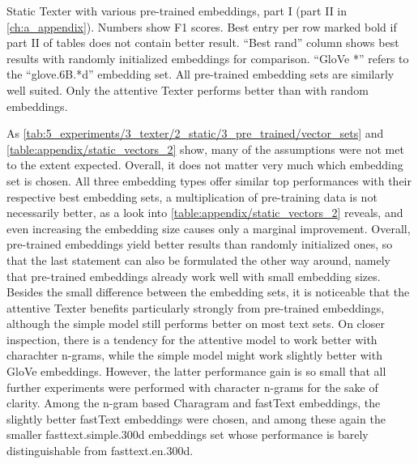 \begin{table}[t]
    \makebox[\textwidth][c]{
        
    }
    \caption{Static Texter with various pre-trained embeddings, part I (part II in \autoref{ch:a_appendix}). Numbers show F1 scores. Best entry per row marked bold if part II of tables does not contain better result. ``Best rand'' column shows best results with randomly initialized embeddings for comparison. ``GloVe *'' refers to the ``glove.6B.*d'' embedding set. All pre-trained embedding sets are similarly well suited. Only the attentive Texter performs better than with random embeddings.}
    \label{tab:5_experiments/3_texter/2_static/3_pre_trained/grid_search}
\end{table}

As \autoref{tab:5_experiments/3_texter/2_static/3_pre_trained/vector_sets} and \autoref{table:appendix/static_vectors_2} show, many of the assumptions were not met to the extent expected. Overall, it does not matter very much which embedding set is chosen. All three embedding types offer similar top performances with their respective best embedding sets, a multiplication of pre-training data is not necessarily better, as a look into \autoref{table:appendix/static_vectors_2} reveals, and even increasing the embedding size causes only a marginal improvement. Overall, pre-trained embeddings yield better results than randomly initialized ones, so that the last statement can also be formulated the other way around, namely that pre-trained embeddings already work well with small embedding sizes. Besides the small difference between the embedding sets, it is noticeable that the attentive Texter benefits particularly strongly from pre-trained embeddings, although the simple model still performs better on most text sets. On closer inspection, there is a tendency for the attentive model to work better with charachter n-grams, while the simple model might work slightly better with GloVe embeddings. However, the latter performance gain is so small that all further experiments were performed with character n-grams for the sake of clarity. Among the n-gram based Charagram and fastText embeddings, the slightly better fastText embeddings were chosen, and among these again the smaller fasttext.simple.300d embeddings set whose performance is barely distinguishable from fasttext.en.300d.
